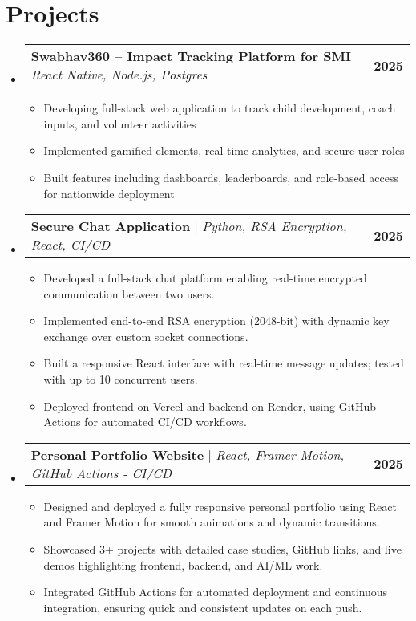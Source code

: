 \documentclass[letterpaper,11pt]{article}
\makeatletter
\newcommand{\resumeItem}[1]{
  \item\small{
    {#1 \vspace{-2pt}}
  }
}
\newcommand{\resumeProjectHeading}[2]{
    \item
    \begin{tabular*}{1.001\textwidth}{l@{\extracolsep{\fill}}r}
      \small#1 & \textbf{\small #2}\\
    \end{tabular*}\vspace{-7pt}
}
\newcommand{\resumeSubHeadingListStart}{\begin{itemize}[leftmargin=0.0in, label={}]}
\newcommand{\resumeSubHeadingListEnd}{\end{itemize}}
\newcommand{\resumeItemListStart}{\begin{itemize}}
\newcommand{\resumeItemListEnd}{\end{itemize}\vspace{-5pt}}
\makeatother
\begin{document}
\section{Projects}
    \vspace{-5pt}
    \resumeSubHeadingListStart
      \resumeProjectHeading
          {\textbf{Swabhav360 -- Impact Tracking Platform for SMI} $|$ \emph{React Native, Node.js, Postgres}}{2025}
          \resumeItemListStart
            \resumeItem{Developing full-stack web application to track child development, coach inputs, and volunteer activities}
            \resumeItem{Implemented gamified elements, real-time analytics, and secure user roles}
            \resumeItem{Built features including dashboards, leaderboards, and role-based access for nationwide deployment}
          \resumeItemListEnd
          \vspace{-13pt}
      \resumeProjectHeading
          {\textbf{Secure Chat Application} $|$ \emph{Python, RSA Encryption, React, CI/CD}}{2025}
          \resumeItemListStart
            \resumeItem{Developed a full-stack chat platform enabling real-time encrypted communication between two users.}
            \resumeItem{Implemented end-to-end RSA encryption (2048-bit) with dynamic key exchange over custom socket connections.}
            \resumeItem{Built a responsive React interface with real-time message updates; tested with up to 10 concurrent users.}
            \resumeItem{Deployed frontend on Vercel and backend on Render, using GitHub Actions for automated CI/CD workflows.}
          \resumeItemListEnd 
          \vspace{-13pt}
      \resumeProjectHeading
          {\textbf{Personal Portfolio Website} $|$ \emph{React, Framer Motion, GitHub Actions - CI/CD}}{2025}
          \resumeItemListStart
            \resumeItem{Designed and deployed a fully responsive personal portfolio using React and Framer Motion for smooth animations and dynamic transitions.}
            \resumeItem{Showcased 3+ projects with detailed case studies, GitHub links, and live demos highlighting frontend, backend, and AI/ML work.}
            \resumeItem{Integrated GitHub Actions for automated deployment and continuous integration, ensuring quick and consistent updates on each push.}
          \resumeItemListEnd
    \resumeSubHeadingListEnd
\vspace{-15pt}

\end{document}
